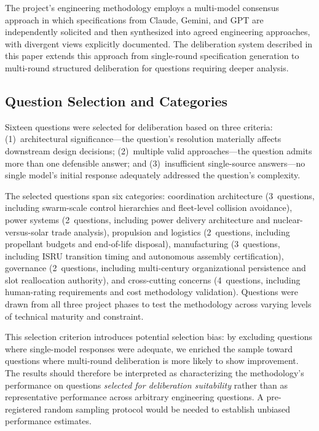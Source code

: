 \documentclass[11pt,a4paper]{article}
\begin{document}
The project's engineering methodology employs a multi-model consensus approach in which specifications from Claude, Gemini, and GPT are independently solicited and then synthesized into agreed engineering approaches, with divergent views explicitly documented. The deliberation system described in this paper extends this approach from single-round specification generation to multi-round structured deliberation for questions requiring deeper analysis.

\subsection{Question Selection and Categories}

Sixteen questions were selected for deliberation based on three criteria: (1)~architectural significance---the question's resolution materially affects downstream design decisions; (2)~multiple valid approaches---the question admits more than one defensible answer; and (3)~insufficient single-source answers---no single model's initial response adequately addressed the question's complexity.

The selected questions span six categories: coordination architecture (3~questions, including swarm-scale control hierarchies and fleet-level collision avoidance), power systems (2~questions, including power delivery architecture and nuclear-versus-solar trade analysis), propulsion and logistics (2~questions, including propellant budgets and end-of-life disposal), manufacturing (3~questions, including ISRU transition timing and autonomous assembly certification), governance (2~questions, including multi-century organizational persistence and slot reallocation authority), and cross-cutting concerns (4~questions, including human-rating requirements and cost methodology validation). Questions were drawn from all three project phases to test the methodology across varying levels of technical maturity and constraint.

This selection criterion introduces potential selection bias: by excluding questions where single-model responses were adequate, we enriched the sample toward questions where multi-round deliberation is more likely to show improvement. The results should therefore be interpreted as characterizing the methodology's performance on questions \emph{selected for deliberation suitability} rather than as representative performance across arbitrary engineering questions. A pre-registered random sampling protocol would be needed to establish unbiased performance estimates.
\end{document}
